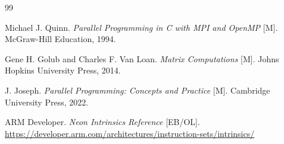 \documentclass[a4paper]{article}
\begin{document}
\renewcommand{\refname}{参考文献}
\begin{thebibliography}{99}

Michael J. Quinn. 
\textit{Parallel Programming in C with MPI and OpenMP} [M]. 
McGraw-Hill Education, 1994.

Gene H. Golub and Charles F. Van Loan. 
\textit{Matrix Computations} [M]. 
Johns Hopkins University Press, 2014.

J. Joseph. 
\textit{Parallel Programming: Concepts and Practice} [M]. 
Cambridge University Press, 2022.

ARM Developer. 
\textit{Neon Intrinsics Reference} [EB/OL]. 
\url{https://developer.arm.com/architectures/instruction-sets/intrinsics/}

\end{thebibliography}
\end{document}
